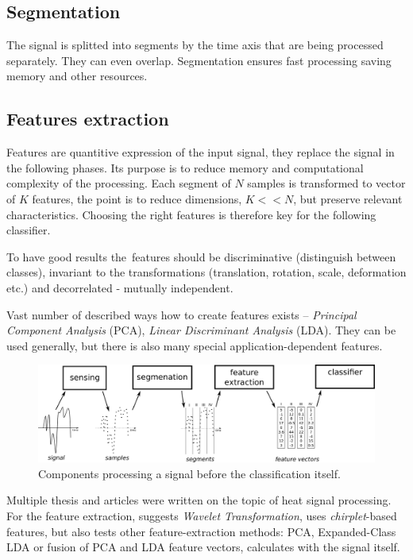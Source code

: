 \subsection*{Segmentation}
The signal is splitted into segments by the time axis that are being processed separately. They can even overlap.
Segmentation ensures fast processing saving memory and other resources.

\subsection*{Features extraction}
Features are quantitive expression of the input signal, they replace the signal in the following phases.
Its purpose is to reduce memory and computational complexity of the processing. Each segment of $N$ samples
is transformed to vector of $K$ features, the point is to reduce dimensions, $K << N$, but preserve
relevant characteristics. Choosing the right features is therefore key for the following classifier.

To have good results the~features should be discriminative (distinguish between classes), invariant to
the transformations (translation, rotation, scale, deformation etc.) and decorrelated - mutually independent.

Vast number of described ways how to create features exists -- {\it Principal Component Analysis} (PCA),
{\it Linear Discriminant Analysis} (LDA). They can be used generally, but there is also many special
application-dependent features. 

\begin{figure}[h!]
\begin{center}
\includegraphics[width=1\textwidth]{obrazky-figures/featureextraction.png}
\caption{Components processing a signal before the classification itself.\label{fig:featureextraction}}
\end{center}
\end{figure}

Multiple thesis and articles were written on the topic of heat signal processing. For the feature extraction,
\cite{SinglePIR} suggests {\it Wavelet Transformation}, \cite{ChirpletSVM} uses {\it chirplet}-based features,
but also tests other feature-extraction methods: PCA, Expanded-Class LDA or fusion of PCA and LDA feature vectors,
\cite{BayesanClassifier} calculates with the signal itself.

